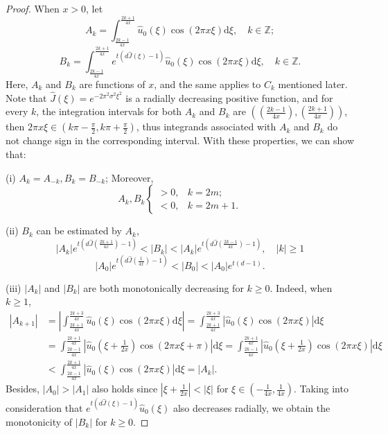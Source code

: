 \documentclass[10pt,a4paper]{amsart}
\newcommand{\Z}{\mathbb{Z}}
\newcommand{\dd}{\mathrm{d}}
\begin{document}
\begin{proof}
 When \(x > 0\), let
\[
A_k = \int_{\frac{2k-1}{4x}}^{\frac{2k+1}{4x}} \hat{u}_0 (\xi) \cos (2\pi x \xi) \dd \xi, \quad k \in \Z;
\]
\[
B_k = \int_{\frac{2k-1}{4x}}^{\frac{2k+1}{4x}} e^{t(d\hat{J}(\xi)-1)} \hat{u}_0 (\xi) \cos (2\pi x \xi) \dd \xi, \quad k \in \mathbb{Z}.
\]
Here, \(A_k\) and \(B_k\) are functions of \(x\), and the same applies to \(C_k\) mentioned later. Note that \(\hat{J}(\xi)=e^{-2\pi^2 \sigma^2\xi^2}\) is a radially decreasing positive function, and for every \(k\), the integration intervals for both \(A_k\) and \(B_k\) are \(\left( (\frac{2k-1}{4x}),(\frac{2k+1}{4x})\right) \), then \(2\pi x\xi\in (k\pi-\frac{\pi}{2},k\pi+\frac{\pi}{2})\), thus integrands associated with \(A_k\) and \(B_k\) do not change sign in the corresponding interval. With these properties, we can show that:

(i) \( A_k = A_{-k}, B_k = B_{-k} \); Moreover,
\[
A_k, B_k
\begin{cases} 
	> 0, & k = 2m;\\ 
	< 0, & k = 2m + 1.
\end{cases}
\]

(ii) \(B_k\) can be estimated by \(A_k\),
\begin{equation}\label{5}
	|A_k|e^{t\left( d\hat{J}\left( \frac{2k+1}{4x} \right)-1 \right)} < |B_k| < |A_k|e^{t\left( d\hat{J}\left( \frac{2k-1}{4x} \right)-1 \right)}, \quad |k| \geq 1
\end{equation}
\begin{equation}\label{6}
	|A_0|e^{t\left( d\hat{J}\left( \frac{1}{4x} \right)-1 \right)} < |B_0| < |A_0|e^{t(d-1)}.
\end{equation}

(iii) \(|A_k|\) and \(|B_k|\) are both monotonically decreasing for \(k\geq0\). Indeed, when \(k\geq 1\),
\begin{align*}
	|A_{k+1}| &= \left| \int_{\frac{2k+1}{4x}}^{\frac{2k+3}{4x}} \hat{u}_0 (\xi) \cos (2\pi x \xi) \dd \xi\right|=\int_{\frac{2k+1}{4x}}^{\frac{2k+3}{4x}} \left| \hat{u}_0 (\xi) \cos (2\pi x \xi)\right|  \dd \xi  \\
	&=  \int_{\frac{2k-1}{4x}}^{\frac{2k+1}{4x}} \left|\hat{u}_0 \left(\xi+\frac{1}{2x}\right) \cos (2\pi x \xi + \pi)\right| \dd \xi= \int_{\frac{2k-1}{4x}}^{\frac{2k+1}{4x}} \left| \hat{u}_0 \left(\xi+\frac{1}{2x}\right) \cos (2\pi x \xi)\right|  \dd \xi  \\
	&< \int_{\frac{2k-1}{4x}}^{\frac{2k+1}{4x}} \left| \hat{u}_0 \left(\xi\right) \cos (2\pi x \xi)\right|\dd \xi=|A_k|.
\end{align*}
Besides, \(|A_0|>|A_1|\) also holds since \(|\xi+\frac{1}{2x}|<|\xi|\) for \(\xi\in (-\frac{1}{4x},\frac{1}{4x})\). Taking into consideration that \( e^{t(d\hat{J}(\xi)-1)}\hat{u}_0(\xi)\) also decreases radially, we obtain the monotonicity of \(|B_k|\) for \(k\geq0\).


\end{proof}
\end{document}
